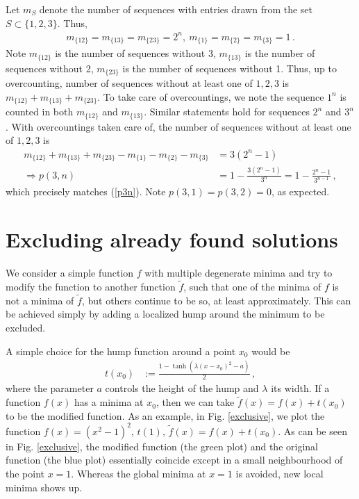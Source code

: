 \documentclass[12pt,a4paper]{JHEP3}
\newcommand{\refb}[1]{(\ref{#1})}
\begin{document}
Let $m_S$ denote the number of sequences with entries drawn from the set $S \subset \{1,2,3\}$. Thus,
\begin{align}
m_{\{12\}} = m_{\{13\}} = m_{\{23\}} = 2^n,~m_{\{1\}}=m_{\{2\}}=m_{\{3\}}=1 \, .
\end{align}
Note $m_{\{12\}}$ is the number of sequences without 3, $m_{\{13\}}$ is the number of sequences without 2, $m_{\{23\}}$ is the number of sequences without 1. Thus, up to overcounting, number of sequences without at least one of $1,2,3$ is $m_{\{12\}} + m_{\{13\}} + m_{\{23\}}$.
To take care of overcountings, we note the sequence $1^n$ is counted in both $m_{\{12\}}$ and $m_{\{13\}}$. Similar statements hold for sequences $2^n$ and $3^n$. With overcountings taken care of, the number of sequences without at least one of $1,2,3$ is
\begin{align}
\nonumber
m_{\{12\}} + m_{\{13\}} + m_{\{23\}} - m_{\{1\}} - m_{\{2\}} - m_{\{3\}} &= 3 (2^n - 1) \\
\Rightarrow p(3,n) &= 1 - \frac{3 (2^n -1)}{3^n} = 1 - \frac{2^n-1}{3^{n-1}} \, ,
\end{align}
which precisely matches \refb{p3n}.
Note $p(3,1)=p(3,2)=0$, as expected.
\section{Excluding already found solutions} \label{appexclude}
We consider a simple function $f$ with multiple degenerate minima and try to  modify the function to another function $\tilde{f}$, such that one of the minima of $f$ is not a minima of $\tilde{f}$, but others continue to be so, at least approximately. This can be achieved simply by adding a localized hump around the minimum to be excluded.

A simple choice for the hump function around a point $x_0$ would be 
\begin{align}
t(x_0) &:= \frac{1 - \tanh \left( \lambda (x-x_0)^2 - a \right)}{2} \, , 
\end{align}
where the parameter $a$ controls  the height  of the hump and $\lambda$ its width. If a function $f(x)$ has a minima at $x_0$, then we can take $\tilde{f}(x) = f(x) + t(x_0)$ to be the modified function. As an example, in Fig. \ref{exclusive}, we plot the function $f(x) = (x^2-1)^2, \, t(1), \, \tilde{f}(x) = f(x) + t(x_0)$. As can  be seen in Fig. \ref{exclusive}, the modified function (the green plot) and the original function (the blue plot) essentially coincide except in a small neighbourhood of the point $x=1$. Whereas the global minima at $x=1$ is avoided, new local minima shows up.
\end{document}
